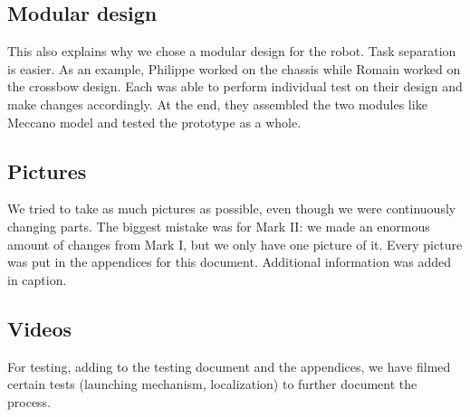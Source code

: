 \documentclass[]{article}
\begin{document}
\subsection{Modular design}
This also explains why we chose a modular design for the robot.  Task separation is easier.  As an example, Philippe worked on the chassis while Romain worked on the crossbow design.  Each was able to perform individual test on their design and make changes accordingly.  At the end, they assembled the two modules like Meccano model and tested the prototype as a whole.
\subsection{Pictures}
We tried to take as much pictures as possible, even though we were continuously changing parts.  The biggest mistake was for Mark II: we made an enormous amount of changes from Mark I, but we only have one picture of it.  Every picture was put in the appendices for this document.  Additional information was added in caption.
\subsection{Videos}
For testing, adding to the testing document and the appendices, we have filmed certain tests (launching mechanism, localization)
to further document the process.


\newpage
\end{document}
